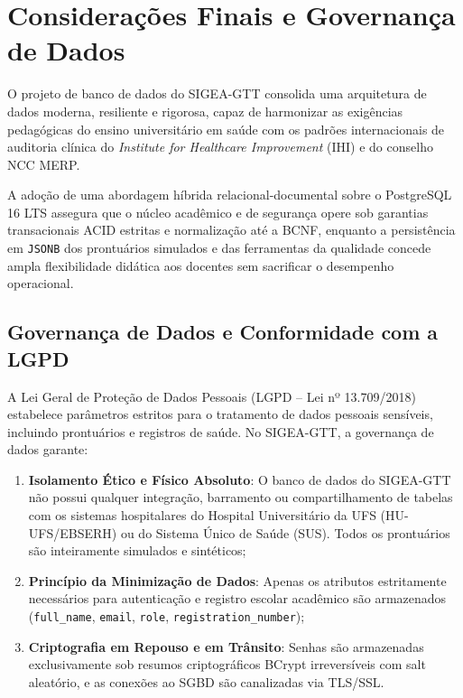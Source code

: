 \chapter{Considerações Finais e Governança de Dados}
\label{cap_consideracoes_finais}

O projeto de banco de dados do SIGEA-GTT consolida uma arquitetura de dados moderna, resiliente e rigorosa, capaz de harmonizar as exigências pedagógicas do ensino universitário em saúde com os padrões internacionais de auditoria clínica do \textit{Institute for Healthcare Improvement} (IHI) e do conselho NCC MERP.

A adoção de uma abordagem híbrida relacional-documental sobre o PostgreSQL 16 LTS assegura que o núcleo acadêmico e de segurança opere sob garantias transacionais ACID estritas e normalização até a BCNF, enquanto a persistência em \texttt{JSONB} dos prontuários simulados e das ferramentas da qualidade concede ampla flexibilidade didática aos docentes sem sacrificar o desempenho operacional.

\section{Governança de Dados e Conformidade com a LGPD}
\label{sec_governanca_lgpd}

A Lei Geral de Proteção de Dados Pessoais (LGPD -- Lei nº 13.709/2018) \cite{lgpd2018} estabelece parâmetros estritos para o tratamento de dados pessoais sensíveis, incluindo prontuários e registros de saúde. No SIGEA-GTT, a governança de dados garante:

\begin{enumerate}
    \item \textbf{Isolamento Ético e Físico Absoluto}: O banco de dados do SIGEA-GTT não possui qualquer integração, barramento ou compartilhamento de tabelas com os sistemas hospitalares do Hospital Universitário da UFS (HU-UFS/EBSERH) ou do Sistema Único de Saúde (SUS). Todos os prontuários são inteiramente simulados e sintéticos;
    \item \textbf{Princípio da Minimização de Dados}: Apenas os atributos estritamente necessários para autenticação e registro escolar acadêmico são armazenados (\texttt{full\_name}, \texttt{email}, \texttt{role}, \texttt{registration\_number});
    \item \textbf{Criptografia em Repouso e em Trânsito}: Senhas são armazenadas exclusivamente sob resumos criptográficos BCrypt irreversíveis com salt aleatório, e as conexões ao SGBD são canalizadas via TLS/SSL.
\end{enumerate}

